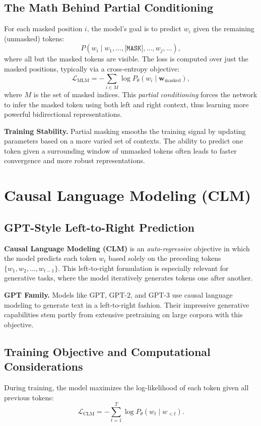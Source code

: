 \subsection{The Math Behind Partial Conditioning}
\noindent
For each masked position \(i\), the model's goal is to predict \(w_i\) given the remaining (unmasked) tokens:
\[
P(w_i \mid w_1, \ldots, \texttt{[MASK]}, \ldots, w_{j}, \ldots),
\]
where all but the masked tokens are visible. The loss is computed over just the masked positions, typically via a cross-entropy objective:
\[
\mathcal{L}_\text{MLM} = - \sum_{i \in M} \log P_{\theta}(w_i \mid \mathbf{w}_{\text{masked}}),
\]
where \(M\) is the set of masked indices. This \emph{partial conditioning} forces the network to infer the masked token using both left and right context, thus learning more powerful bidirectional representations.

\noindent
\textbf{Training Stability.}
Partial masking smooths the training signal by updating parameters based on a more varied set of contexts. The ability to predict one token given a surrounding window of unmasked tokens often leads to faster convergence and more robust representations.

\section{Causal Language Modeling (CLM)}
\label{sec:clm}

\subsection{GPT-Style Left-to-Right Prediction}
\noindent
\textbf{Causal Language Modeling (CLM)} is an \emph{auto-regressive} objective in which the model predicts each token \(w_t\) based solely on the preceding tokens \(\{w_1, w_2, \ldots, w_{t-1}\}\). This left-to-right formulation is especially relevant for generative tasks, where the model iteratively generates tokens one after another.

\textbf{GPT Family.}
Models like GPT, GPT-2, and GPT-3 use causal language modeling to generate text in a left-to-right fashion. Their impressive generative capabilities stem partly from extensive pretraining on large corpora with this objective.

\subsection{Training Objective and Computational Considerations}
\noindent
During training, the model maximizes the log-likelihood of each token given all previous tokens:
\[
\mathcal{L}_\text{CLM} = - \sum_{t=1}^{T} \log P_{\theta}(w_t \mid w_{<t}).
\]

